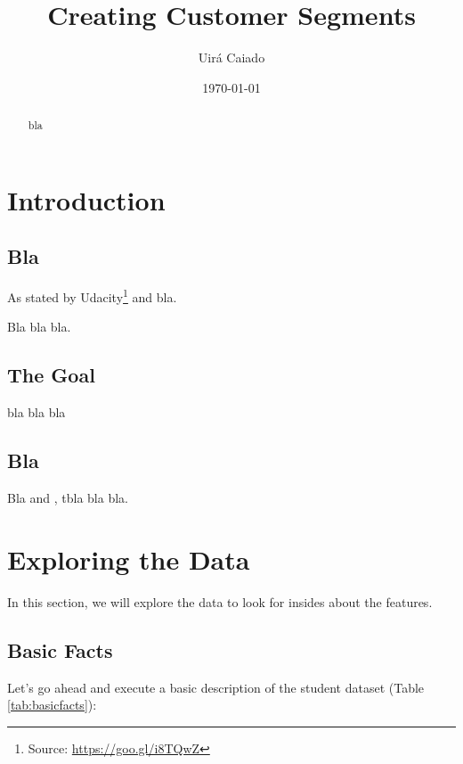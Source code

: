 \documentclass[a4paper]{article}
\title{Creating Customer Segments}
\author{Uirá Caiado}
\date{\today}
\begin{document}
\maketitle

\begin{abstract}
bla
\end{abstract}


\section{Introduction}
\label{sec:introduction}

\subsection{Bla}
As stated by Udacity\footnote{Source: \url{https://goo.gl/i8TQwZ}}  and bla.

Bla bla bla.

\subsection{The Goal}
bla bla bla

\subsection{Bla}
Bla and \cite{Hastie_2009}, tbla bla bla.



\section{Exploring the Data}
\label{sec:exploring_data}
In this section, we will explore the data to look for insides about the features.

\subsection{Basic Facts}
Let's go ahead and execute a basic description of the student dataset (Table \ref{tab:basicfacts}):
\end{document}
